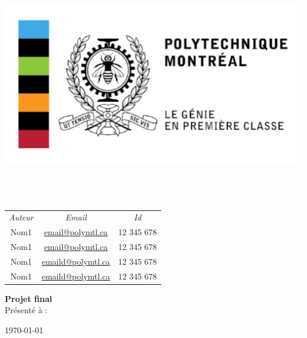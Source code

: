 \begin{titlepage}
\begin{center}

\includegraphics[scale=0.2]{img/logo.png}\\
\textsc{\normalsize\faculte}\\[1.2cm]

\HRule\\[0.4cm]
{\huge\bfseries\doctitle}
\HRule\\[1.5cm]

\begin{tabulary}{\textwidth}{C C C}
  \large\emph{Auteur} & 
  \large\emph{Email} &
  \large\emph{Id} \\
  Nom1 & \href{mailto:email@polymtl.ca}{email@polymtl.ca} & 12 345 678  \\
  Nom1 & \href{mailto:email@polymtl.ca}{email@polymtl.ca} & 12 345 678  \\
  Nom1 & \href{mailto:email@polymtl.ca}{emaild@polymtl.ca} & 12 345 678  \\
  Nom1 & \href{mailto:email@polymtl.ca}{emaild@polymtl.ca} & 12 345 678 \\
\end{tabulary}

\vfill
{\Large \textbf{Projet final} \\}
\vfill
Présenté à :\\
\institution

\vfill

{\large \today}

\end{center}
\end{titlepage}